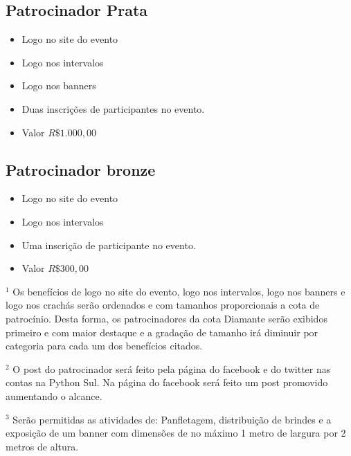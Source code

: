 \documentclass[12pt]{article}
\begin{document}
\subsection{Patrocinador Prata}
    \begin{itemize}[label={}]
    \setlength\itemsep{0.0em}
        \item Logo no site do evento
        \item Logo nos intervalos
        \item Logo nos banners
        \item Duas inscrições de participantes no evento.
        \item Valor $R\$ 1.000,00$
    \end{itemize}
\subsection{Patrocinador bronze}
    \begin{itemize}[label={}]
    \setlength\itemsep{0.0em}
        \item Logo no site do evento
        \item Logo nos intervalos
        \item Uma inscrição de participante no evento.
        \item Valor $R\$ 300,00$
    \end{itemize}

$^1$ Os benefícios de logo no site do evento, logo nos intervalos, logo nos banners e logo nos crachás serão ordenados e com tamanhos proporcionais a cota de patrocínio. Desta forma, os patrocinadores da cota Diamante serão exibidos primeiro e com maior destaque e a gradação de tamanho irá diminuir por categoria para cada um dos benefícios citados.

$^2$ O post do patrocinador será feito pela página do facebook e do twitter nas contas na Python Sul. Na página do facebook será feito um post promovido aumentando o alcance.

$^3$ Serão permitidas as atividades de: Panfletagem, distribuição de brindes e a exposição de um  banner com dimensões de no máximo 1 metro de largura por 2 metros de  altura.
\end{document}
